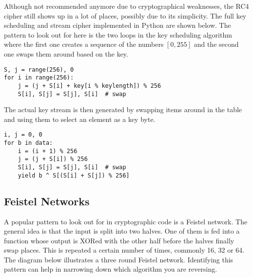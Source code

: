 \documentclass[twocolumn]{article}
\begin{document}
Although not recommended anymore due to cryptographical weaknesses, the RC4 cipher still shows up in a lot of places, possibly due to its simplicity. The full key scheduling and stream cipher implemented in Python are shown below. The pattern to look out for here is the two loops in the key scheduling algorithm where the first one creates a sequence of the numbers $[0,255]$ and the second one swaps them around based on the key.
\vspace*{-0.3\baselineskip}

\begin{verbatim}
S, j = range(256), 0
for i in range(256):
    j = (j + S[i] + key[i % keylength]) % 256
    S[i], S[j] = S[j], S[i]  # swap
\end{verbatim}

The actual key stream is then generated by swapping items around in the table and using them to select an element as a key byte.

\begin{verbatim}
i, j = 0, 0
for b in data:
    i = (i + 1) % 256
    j = (j + S[i]) % 256
    S[i], S[j] = S[j], S[i]  # swap
    yield b ^ S[(S[i] + S[j]) % 256]
\end{verbatim}
\vspace*{-2\baselineskip}

\subsection*{Feistel Networks}

A popular pattern to look out for in cryptographic code is a Feistel network. The general idea is that the input is split into two halves. One of them is fed into a function whose output is XORed with the other half before the halves finally swap places. This is repeated a certain number of times, commonly 16, 32 or 64. The diagram below illustrates a three round Feistel network. Identifying this pattern can help in narrowing down which algorithm you are reversing.

\vspace*{-2\baselineskip}
\end{document}
